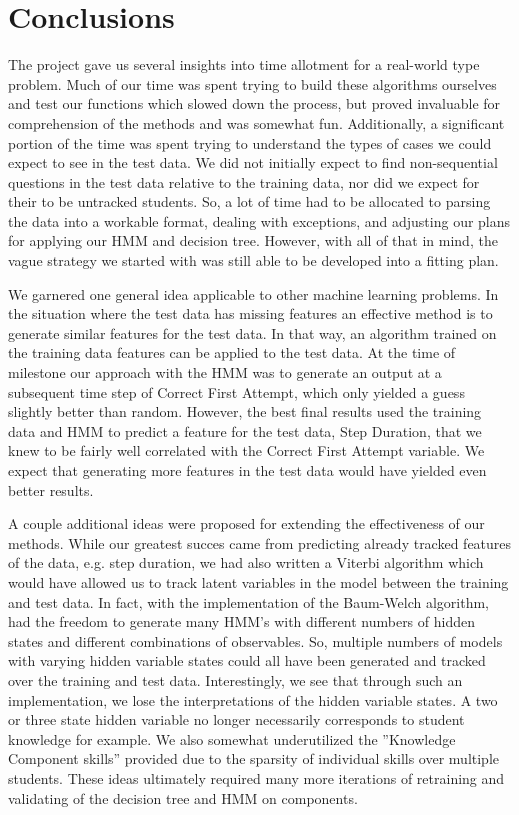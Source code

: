 \documentclass{article} %
\begin{document}
\section{Conclusions}

The project gave us several insights into time allotment for a real-world type problem. Much of our time was spent trying to build these algorithms ourselves and test our functions which slowed down the process, but proved invaluable for comprehension of the methods and was somewhat fun. Additionally, a significant portion of the time was spent trying to understand the types of cases we could expect to see in the test data. We did not initially expect to find non-sequential questions in the test data relative to the training data, nor did we expect for their to be untracked students. So, a lot of time had to be allocated to parsing the data into a workable format, dealing with exceptions, and adjusting our plans for applying our HMM and decision tree. However, with all of that in mind, the vague strategy we started with was still able to be developed into a fitting plan.

We garnered one general idea applicable to other machine learning problems. In the situation where the test data has missing features an effective method is to generate similar features for the test data. In that way, an algorithm trained on the training data features can be applied to the test data. At the time of milestone our approach with the HMM was to generate an output at a subsequent time step of Correct First Attempt, which only yielded a guess slightly better than random. However, the best final results used the training data and HMM to predict a feature for the test data, Step Duration, that we knew to be fairly well correlated with the Correct First Attempt variable. We expect that generating more features in the test data would have yielded even better results. 

A couple additional ideas were proposed for extending the effectiveness of our methods. While our greatest succes came from predicting already tracked features of the data, e.g. step duration, we had also written a Viterbi algorithm which would have allowed us to track latent variables in the model between the training and test data. In fact, with the implementation of the Baum-Welch algorithm, had the freedom to generate many HMM's with different numbers of hidden states and  different combinations of observables. So, multiple numbers of models with varying hidden variable states could all have been generated and tracked over the training and test data. Interestingly, we see that through such an implementation, we lose the interpretations of the hidden variable states. A two or three state hidden variable no longer necessarily corresponds to student knowledge for example. We also somewhat underutilized the ''Knowledge Component skills'' provided due to the sparsity of individual skills over multiple students. These ideas ultimately required many more iterations of retraining and validating of the decision tree and HMM on components.
\end{document}
